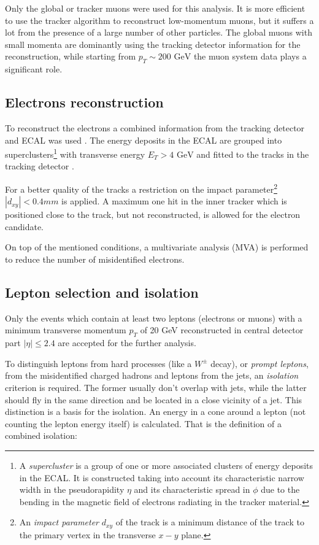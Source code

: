 Only the global or tracker muons were used for this analysis. It is more efficient to use the tracker algorithm to reconstruct
low-momentum muons, but it suffers a lot from the presence of a large number of other particles. The global muons with small momenta
are dominantly using the tracking detector information for the reconstruction, while starting from $p_{T} \sim \textrm{200 GeV}$
the muon system data plays a significant role.

\subsection{Electrons reconstruction}\label{ssec:ElRec}

To reconstruct the electrons a combined information from the tracking detector and ECAL was used \cite{CMS-PAS-EGM-10-004}. The energy
deposits in the ECAL are grouped into superclusters\footnote{A \textit{supercluster} is  a group of one or more associated clusters 
of energy deposits in the ECAL. It is constructed taking into account its characteristic narrow width in the pseudorapidity $\eta$
and its characteristic spread in $\phi$ due to the bending in the magnetic field of electrons radiating in the tracker material.} 
with transverse energy $E_{T} > \textrm{4 GeV}$ and fitted to the tracks in the tracking detector \cite{GSF_Electron_Reconstruction_CMS}.

For a better quality of the tracks a restriction on the impact parameter\footnote{An \textit{impact parameter} $d_{xy}$ of the track is a minimum
distance of the track to the primary vertex in the transverse $x-y$ plane.} $|d_{xy}| < 0.4 mm$ is applied. A maximum one hit in the inner tracker
which is positioned close to the track, but not reconstructed, is allowed for the electron candidate.

On top of the mentioned conditions, a multivariate analysis (MVA) is performed to reduce the number of misidentified electrons.

\subsection{Lepton selection and isolation}

Only the events which contain at least two leptons (electrons or muons) with a minimum transverse momentum $p_{T}$ of 20 GeV reconstructed
in central detector part $|\eta| \leq 2.4$ are accepted for the further analysis.

To distinguish leptons from hard processes (like a $W^{\pm}$ decay), or \textit{prompt leptons}, from the misidentified charged hadrons 
and leptons from the jets, an \textit{isolation} criterion is required. The former usually don't overlap with jets, while the latter should
fly in the same direction and be located in a close vicinity of a jet. This distinction is a basis for the isolation. An energy in a cone 
around a lepton (not counting the lepton energy itself) is calculated. That is the definition of a combined isolation:

